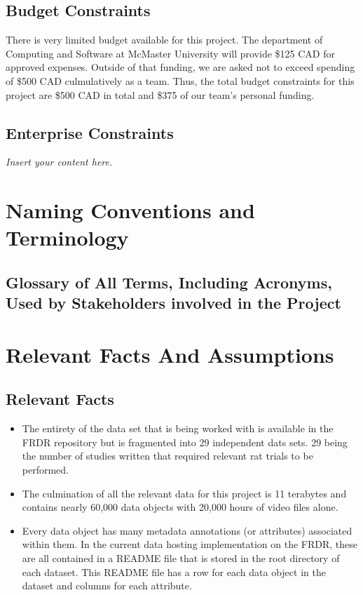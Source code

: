 \documentclass[12pt]{article}
\newcommand{\lips}{\textit{Insert your content here.}}
\begin{document}
\subsection{Budget Constraints}

\par{There is very limited budget available for this project. The department of Computing and Software at McMaster University 
will provide \$125 CAD for approved expenses. Outside of that funding, we are asked not to exceed spending of \$500 CAD
culmulatively as a team. Thus, the total budget constraints for this project are \$500 CAD in total and \$375 of our team's personal funding.}

\subsection{Enterprise Constraints}
\lips

\section{Naming Conventions and Terminology}
\subsection{Glossary of All Terms, Including Acronyms, Used by Stakeholders
involved in the Project}

\printnoidxglossary[type=SWE, title={Software Engineering Terms}]
\printnoidxglossary[type=domain, title={Domain-Specific Research Terms}]
\printnoidxglossary[type=general, title={General Terms}]



\section{Relevant Facts And Assumptions}
\subsection{Relevant Facts}

\begin{itemize}
    \item The entirety of the data set that is being worked with is available in the FRDR repository
    but is fragmented into 29 independent dats sets. 29 being the number of studies written that required relevant
    rat trials to be performed.
    \item The culmination of all the relevant data for this project is 11 terabytes and contains nearly 60,000 data objects with
    20,000 hours of video files alone.
    \item Every data object has many metadata annotations (or attributes) associated within them. In the current data hosting
    implementation on the FRDR, these are all contained in a README file that is stored in the root directory of each dataset.
    This README file has a row for each data object in the dataset and columns for each attribute.
\end{itemize}
\end{document}
